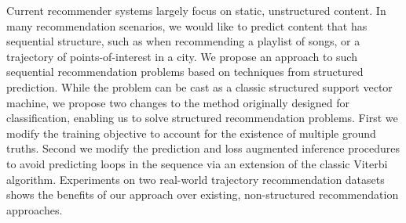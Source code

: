 
Current recommender systems largely focus on static, unstructured content.
In many recommendation scenarios, we would like to predict content that has sequential structure,
such as when recommending a playlist of songs, or a trajectory of points-of-interest in a city.
We propose an approach to such sequential recommendation problems based on techniques from structured prediction.
While the problem can be cast as a classic structured support vector machine,
we propose two changes to the method originally designed for classification,
enabling us to solve structured recommendation problems.
First we modify the training objective to account for the existence of multiple ground truths.
Second we modify the prediction and loss augmented inference procedures to avoid predicting loops in the sequence via an extension of the classic Viterbi algorithm.
Experiments on two real-world trajectory recommendation datasets shows the benefits of our approach over existing, non-structured recommendation approaches.
